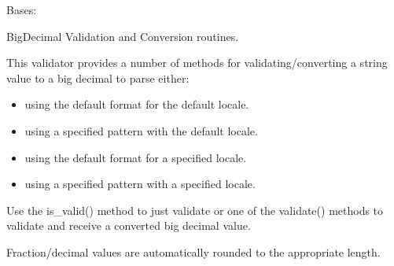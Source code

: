 \documentclass[letterpaper,10pt,english]{sphinxmanual}
\begin{document}
\begin{fulllineitems}
\label{\detokenize{apache_commons_validator_python.routines:apache_commons_validator_python.routines.big_decimal_validator.BigDecimalValidator}}
\pysigstartsignatures
{}
\pysigstopsignatures
\sphinxAtStartPar
Bases: {\hyperref[\detokenize{apache_commons_validator_python.routines:apache_commons_validator_python.routines.abstract_number_validator.AbstractNumberValidator}]{}}

\sphinxAtStartPar
BigDecimal Validation and Conversion routines.

\sphinxAtStartPar
This validator provides a number of methods for validating/converting a string value
to a big decimal to parse either:
\begin{itemize}
\item {} 
\sphinxAtStartPar
using the default format for the default locale.

\item {} 
\sphinxAtStartPar
using a specified pattern with the default locale.

\item {} 
\sphinxAtStartPar
using the default format for a specified locale.

\item {} 
\sphinxAtStartPar
using a specified pattern with a specified locale.

\end{itemize}

\sphinxAtStartPar
Use the is\_valid() method to just validate or one of the validate() methods to
validate and receive a converted big decimal value.

\sphinxAtStartPar
Fraction/decimal values are automatically rounded to the appropriate length.


\end{fulllineitems}
\end{document}
